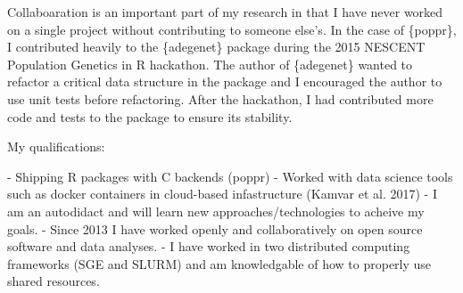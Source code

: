 \vspace{1ex}


Collaboaration is an important part of my research in that I have never worked
on a single project without contributing to someone else's. In the case of
\{poppr\}, I contributed heavily to the \{adegenet\} package during
the 2015 NESCENT Population Genetics in R hackathon. The author of \{adegenet\}
wanted to refactor a critical data structure in the package and I encouraged the
author to use unit tests before refactoring. After the hackathon, I had 
contributed more code and tests to the package to ensure its stability. 


\vspace{1ex}








My qualifications: 

 - Shipping R packages with C backends (poppr)
 - Worked with data science tools such as docker containers in cloud-based infastructure (Kamvar et al. 2017)
 - I am an autodidact and will learn new approaches/technologies to acheive my goals.
 - Since 2013 I have worked openly and collaboratively on open source software and data analyses. 
 - I have worked in two distributed computing frameworks (SGE and SLURM) and am knowledgable of how to properly use shared resources.




